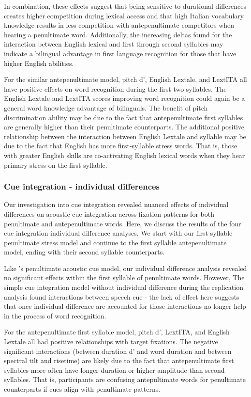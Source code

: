 In combination, these effects suggest that being sensitive to durational differences creates higher competition during lexical access and that high Italian vocabulary knowledge results in less competition with antepenultimate competitors when hearing a penultimate word. Additionally, the increasing deltas found for the interaction between English lexical and first through second syllables may indicate a bilingual advantage in first language recognition for those that have higher English abilities. 

For the similar antepenultimate model, pitch d', English Lextale, and LextITA all have positive effects on word recognition during the first two syllables. The English Lextale and LextITA scores improving word recognition could again be a general word knowledge advantage of bilinguals. The benefit of pitch discrimination ability may be due to the fact that antepenultimate first syllables are generally higher than their penultimate counterparts. The additional positive relationship between the interaction between English Lextale and syllable may be due to the fact that English has more first-syllable stress words. That is, those with greater English skills are co-activating English lexical words when they hear primary stress on the first syllable.

\subsubsection{Cue integration - individual differences}
Our investigation into cue integration revealed nuanced effects of individual differences on acoustic cue integration across fixation patterns for both penultimate and antepenultimate words. Here, we discuss the results of the four cue integration individual difference analyses. We start with our first syllable penultimate stress model and continue to the first syllable antepenultimate model, ending with their second syllable counterparts.

Like \cite{Sulpizio_McQueen_2012}'s penultimate acoustic cue model, our individual difference analysis revealed no significant effects within the first syllable of penultimate words. However, The simple cue integration model without individual difference during the replication analysis found interactions between speech cue - the lack of effect here suggests that once individual difference are accounted for those interactions no longer help in the process of word recognition. 

For the antepenultimate first syllable model, pitch d', LextITA, and English Lextale all had positive relationships with target fixations. The negative significant interactions (between duration d' and word duration and between spectral tilt and risetime) are likely due to the fact that antepenultimate first syllables more often have longer duration or higher amplitude than second syllables. That is, participants are confusing antepultimate words for penultimate counterparts if cues align with penultimate patterns.

